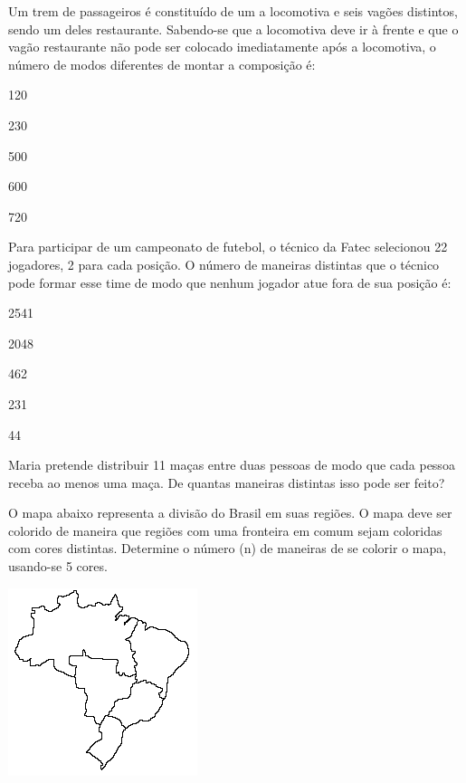 			\item Um trem de passageiros é constituído de um a locomotiva e seis vagões distintos, sendo um deles restaurante. Sabendo-se que a locomotiva deve ir à frente e que o vagão restaurante não pode ser colocado imediatamente após a locomotiva, o número de modos diferentes de montar a composição é:
			\begin{enumerate}
				\end{enumerate}

		\item Para participar de um campeonato de futebol, o técnico da Fatec selecionou 22 jogadores, 2 para cada posição. O número de maneiras distintas que o técnico pode formar esse time de modo que nenhum jogador atue fora de sua posição é:
		\begin{enumerate}
					\begin{multicols}{5}
					\item 2541
	  				\item 2048
	  				\item 462
	  				\item 231
	  				\item  44		
	  				\end{multicols}
				\end{enumerate}

		\item Maria pretende distribuir 11 maças entre duas pessoas de modo que cada pessoa receba ao menos uma maça. De quantas maneiras distintas isso pode ser feito?

		\item O mapa abaixo representa a divisão do Brasil em suas regiões. O mapa deve ser colorido de maneira que regiões com uma fronteira em comum sejam coloridas com cores distintas. Determine o número (n) de maneiras de se colorir o mapa, usando-se 5 cores.
		\begin{center}
		 	\includegraphics[scale=0.8]{figuras/fig16.png}
		\end{center}
		
